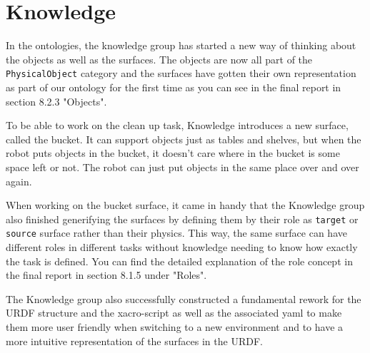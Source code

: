 \documentclass[main.tex]{subfiles}
\begin{document}
	
	\chapter{Knowledge}

In the ontologies, the knowledge group has started a new way of thinking about the objects as well as the surfaces. The objects are now all part of the \texttt{PhysicalObject} category and the surfaces have gotten their own representation as part of our ontology for the first time as you can see in the final report in section 8.2.3 "Objects".

To be able to work on the clean up task, Knowledge introduces a new surface, called the bucket. It can support objects just as tables and shelves, but when the robot puts objects in the bucket, it doesn't care where in the bucket is some space left or not. The robot can just put objects in the same place over and over again.

When working on the bucket surface, it came in handy that the Knowledge group also finished generifying the surfaces by defining them by their role as \texttt{target} or \texttt{source} surface rather than their physics. This way, the same surface can have different roles in different tasks without knowledge needing to know how exactly the task is defined. You can find the detailed explanation of the role concept in the final report in section 8.1.5 under "Roles".

The Knowledge group also successfully constructed a fundamental rework for the URDF structure and the xacro-script as well as the associated yaml to make them more user friendly when switching to a new environment and to have a more intuitive representation of the surfaces in the URDF.
	
\end{document}
